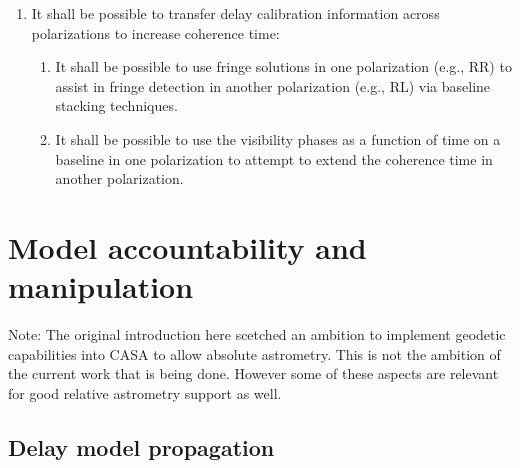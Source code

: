 \documentclass[11pt,a4paper]{article}
\begin{document}
\begin{enumerate}[subseclist]

\item It shall be possible to transfer delay calibration information
  across polarizations to increase coherence time:

\begin{enumerate}[subsecsublist]

\item It shall be possible to use fringe solutions in one polarization
  (e.g., RR) to assist in fringe detection in another polarization
  (e.g., RL) via baseline stacking techniques.

\item It shall be possible to use the visibility phases as a function
  of time on a baseline in one polarization to attempt to extend the
  coherence time in another polarization.

\end{enumerate}

\end{enumerate}


\section{Model accountability and manipulation}

Note: The original introduction here scetched an ambition to implement
geodetic capabilities into CASA to allow absolute astrometry.  This is
not the ambition of the current work that is being done.  However some
of these aspects are relevant for good relative astrometry support as
well.

\subsection{Delay model propagation}
\end{document}
